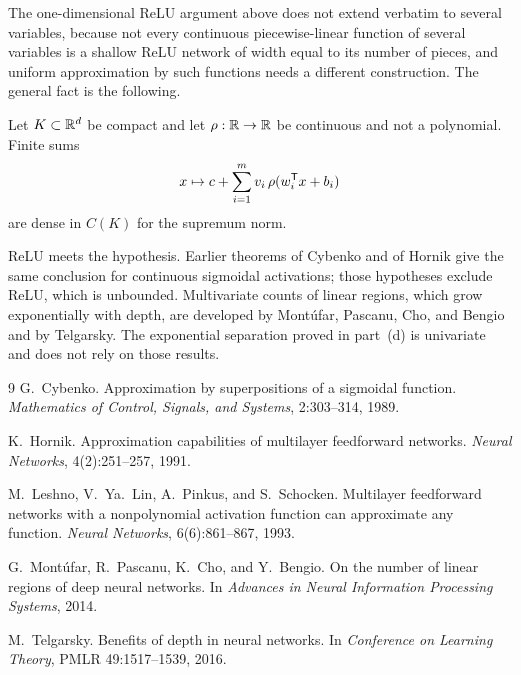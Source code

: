 The one-dimensional ReLU argument above does not extend verbatim to several variables, because not every continuous piecewise-linear function of several variables is a shallow ReLU network of width equal to its number of pieces, and uniform approximation by such functions needs a different construction. The general fact is the following.

\begin{proposition}
Let \(K\subset\mathbb{R}^d\) be compact and let \(\rho:\mathbb{R}\to\mathbb{R}\) be continuous and not a polynomial. Finite sums
\[
  x \mapsto c + \sum_{i=1}^{m} v_i\,\rho(w_i^{\mathsf{T}} x + b_i)
\]
are dense in \(C(K)\) for the supremum norm.
\end{proposition}

ReLU meets the hypothesis. Earlier theorems of Cybenko and of Hornik give the same conclusion for continuous sigmoidal activations; those hypotheses exclude ReLU, which is unbounded. Multivariate counts of linear regions, which grow exponentially with depth, are developed by Mont\'ufar, Pascanu, Cho, and Bengio and by Telgarsky. The exponential separation proved in part~(d) is univariate and does not rely on those results.

\begin{thebibliography}{9}
G.~Cybenko.
\newblock Approximation by superpositions of a sigmoidal function.
\newblock \emph{Mathematics of Control, Signals, and Systems}, 2:303--314, 1989.

K.~Hornik.
\newblock Approximation capabilities of multilayer feedforward networks.
\newblock \emph{Neural Networks}, 4(2):251--257, 1991.

M.~Leshno, V.~Ya.~Lin, A.~Pinkus, and S.~Schocken.
\newblock Multilayer feedforward networks with a nonpolynomial activation function can approximate any function.
\newblock \emph{Neural Networks}, 6(6):861--867, 1993.

G.~Mont\'ufar, R.~Pascanu, K.~Cho, and Y.~Bengio.
\newblock On the number of linear regions of deep neural networks.
\newblock In \emph{Advances in Neural Information Processing Systems}, 2014.

M.~Telgarsky.
\newblock Benefits of depth in neural networks.
\newblock In \emph{Conference on Learning Theory}, PMLR 49:1517--1539, 2016.
\end{thebibliography}


